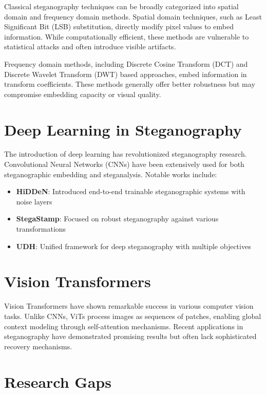 \documentclass[12pt,a4paper]{report}
\begin{document}
Classical steganography techniques can be broadly categorized into spatial domain and frequency domain methods. Spatial domain techniques, such as Least Significant Bit (LSB) substitution, directly modify pixel values to embed information. While computationally efficient, these methods are vulnerable to statistical attacks and often introduce visible artifacts.

Frequency domain methods, including Discrete Cosine Transform (DCT) and Discrete Wavelet Transform (DWT) based approaches, embed information in transform coefficients. These methods generally offer better robustness but may compromise embedding capacity or visual quality.

\section{Deep Learning in Steganography}

The introduction of deep learning has revolutionized steganography research. Convolutional Neural Networks (CNNs) have been extensively used for both steganographic embedding and steganalysis. Notable works include:

\begin{itemize}
    \item \textbf{HiDDeN}: Introduced end-to-end trainable steganographic systems with noise layers
    \item \textbf{StegaStamp}: Focused on robust steganography against various transformations
    \item \textbf{UDH}: Unified framework for deep steganography with multiple objectives
\end{itemize}

\section{Vision Transformers}

Vision Transformers have shown remarkable success in various computer vision tasks. Unlike CNNs, ViTs process images as sequences of patches, enabling global context modeling through self-attention mechanisms. Recent applications in steganography have demonstrated promising results but often lack sophisticated recovery mechanisms.

\section{Research Gaps}
\end{document}
